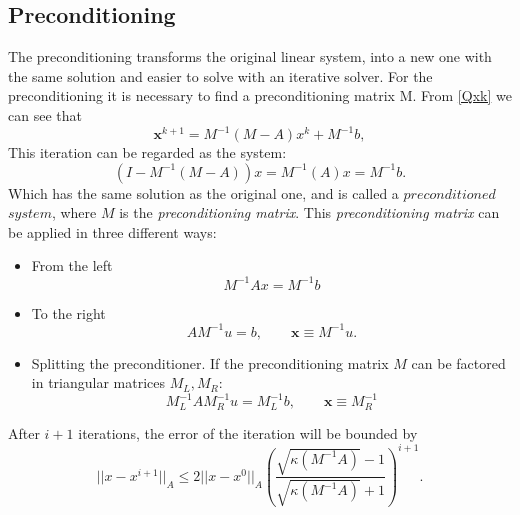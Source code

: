 \documentclass[12pt]{report}
\begin{document}
\subsection{Preconditioning}
The preconditioning transforms the original linear system, into a new one with the same solution and easier to solve
with an iterative solver. For the preconditioning it is necessary to find a preconditioning matrix M. From \eqref{Qxk} we can see that
\begin{equation*}
\mathbf{x}^{k+1}=M^{-1}(M-A)x^{k}+M^{-1}b,
\end{equation*}
This iteration can be regarded as the system:
$$(I-M^{-1}(M-A))x=M^{-1}(A)x=M^{-1}b.$$
Which has the same solution as the original one, and is called a $preconditioned$ $system$, where
$M$ is the \emph{preconditioning matrix}.
This \emph{preconditioning matrix} can be applied in three different ways:
\begin{itemize}
\item{From the left} 
$$M^{-1}Ax=M^{-1}b$$
\item{To the right}
$$AM^{-1}u=b, \qquad\mathbf{x}\equiv M^{-1}u.$$
\item{Splitting the preconditioner.} If the preconditioning matrix $M$ can be factored in triangular matrices $M_L, M_R$:
$$M^{-1}_LAM_R^{-1}u=M_L^{-1}b, \qquad\mathbf{x}\equiv M_R^{-1}$$
\end{itemize}
After $i+1$ iterations, the error of the iteration will be bounded by
\begin{equation*}
 ||x-x^{i+1}||_A\leq 2||x-x^{0}||_A \left( \frac{\sqrt{\kappa(M^{-1}A)}-1}{\sqrt{\kappa(M^{-1}A)}+1} \right)^{i+1}.
\end{equation*}
\end{document}
